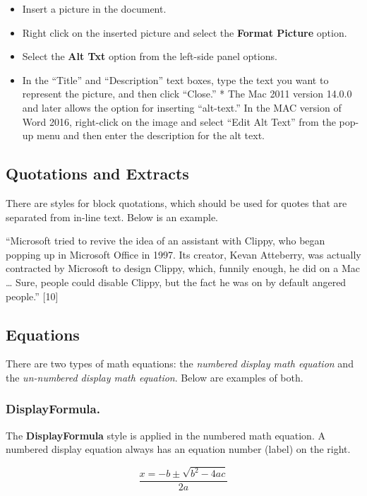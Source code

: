 \documentclass[conference]{IEEEtran}
\begin{document}
\begin{itemize}
\item Insert a picture in the document.
\item Right click on the inserted picture and select the \textbf{Format Picture} option.
\item Select the \textbf{Alt Txt} option from the left-side panel options.
\item In the “Title” and “Description” text boxes, type the text you want to represent the picture, and then click “Close.”
* The Mac 2011 version 14.0.0 and later allows the option for inserting “alt-text.” In the MAC version of Word 2016, right-click on the image and select “Edit Alt Text” from the pop-up menu and then enter the description for the alt text. 
\end{itemize}
\subsection{Quotations and Extracts}

There are styles for block quotations, which should be used for quotes that are separated from in-line text.  Below is an example.

“Microsoft tried to revive the idea of an assistant with Clippy, who began popping up in Microsoft Office in 1997.  Its creator, Kevan Atteberry, was actually contracted by Microsoft to design Clippy, which, funnily enough, he did on a Mac …  Sure, people could disable Clippy, but the fact he was on by default angered people.” [10] 

\subsection{Equations}

There are two types of math equations: the \textit{numbered display math equation} and the \textit{un-numbered display math equation}. Below are examples of both.

\subsubsection{DisplayFormula.}

The \textbf{DisplayFormula} style is applied in the numbered math equation. A numbered display equation always has an equation number (label) on the right.

\begin{equation}
\frac{x=-b\pm\sqrt{{b}^{2} - 4 a c}}{2a}
\end{equation}
\end{document}
